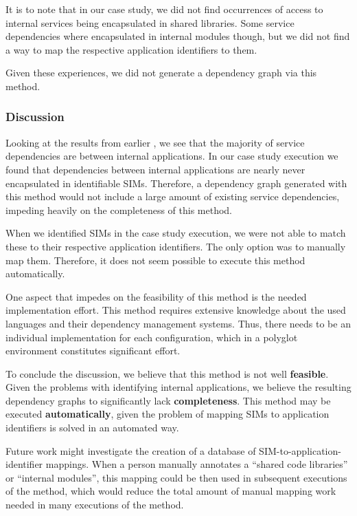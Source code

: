 It is to note that in our case study, we did not find occurrences of access to internal services being encapsulated in shared libraries. Some service dependencies where encapsulated in internal modules though, but we did not find a way to map the respective application identifiers to them.


Given these experiences, we did not generate a dependency graph via this method.

\subsubsection{Discussion}

Looking at the results from earlier , we see that the majority of service dependencies are between internal applications. In our case study execution we found that dependencies between internal applications are nearly never encapsulated in identifiable SIMs. Therefore, a dependency graph generated with this method would not include a large amount of existing service dependencies, impeding heavily on the completeness of this method.

When we identified SIMs in the case study execution, we were not able to match these to their respective application identifiers. The only option was to manually map them. Therefore, it does not seem possible to execute this method automatically.

One aspect that impedes on the feasibility of this method is the needed implementation effort. This method requires extensive knowledge about the used languages and their dependency management systems. Thus, there needs to be an individual implementation for each configuration, which in a polyglot environment constitutes significant effort.


To conclude the discussion, we believe that this method is not well \textbf{feasible}. Given the problems with identifying internal applications, we believe the resulting dependency graphs to significantly lack \textbf{completeness}. This method may be executed \textbf{automatically}, given the problem of mapping SIMs to application identifiers is solved in an automated way.

Future work might investigate the creation of a database of SIM-to-application-identifier mappings. When a person manually annotates a  ``shared code libraries'' or ``internal modules'', this mapping could be then used in subsequent executions of the method, which would reduce the total amount of manual mapping work needed in many executions of the method.

